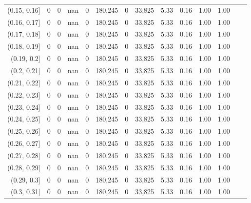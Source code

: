 \begin{tabular}{rrrrrrrrrrrrrr}
(0.15, 0.16]   &       0 &      0 &     nan &        0 &  180,245 &       0 &  33,825 &  5.33 &  0.16 &  1.00 &      1.00 \\
(0.16, 0.17]   &       0 &      0 &     nan &        0 &  180,245 &       0 &  33,825 &  5.33 &  0.16 &  1.00 &      1.00 \\
(0.17, 0.18]   &       0 &      0 &     nan &        0 &  180,245 &       0 &  33,825 &  5.33 &  0.16 &  1.00 &      1.00 \\
(0.18, 0.19]   &       0 &      0 &     nan &        0 &  180,245 &       0 &  33,825 &  5.33 &  0.16 &  1.00 &      1.00 \\
(0.19, 0.2]    &       0 &      0 &     nan &        0 &  180,245 &       0 &  33,825 &  5.33 &  0.16 &  1.00 &      1.00 \\
(0.2, 0.21]    &       0 &      0 &     nan &        0 &  180,245 &       0 &  33,825 &  5.33 &  0.16 &  1.00 &      1.00 \\
(0.21, 0.22]   &       0 &      0 &     nan &        0 &  180,245 &       0 &  33,825 &  5.33 &  0.16 &  1.00 &      1.00 \\
(0.22, 0.23]   &       0 &      0 &     nan &        0 &  180,245 &       0 &  33,825 &  5.33 &  0.16 &  1.00 &      1.00 \\
(0.23, 0.24]   &       0 &      0 &     nan &        0 &  180,245 &       0 &  33,825 &  5.33 &  0.16 &  1.00 &      1.00 \\
(0.24, 0.25]   &       0 &      0 &     nan &        0 &  180,245 &       0 &  33,825 &  5.33 &  0.16 &  1.00 &      1.00 \\
(0.25, 0.26]   &       0 &      0 &     nan &        0 &  180,245 &       0 &  33,825 &  5.33 &  0.16 &  1.00 &      1.00 \\
(0.26, 0.27]   &       0 &      0 &     nan &        0 &  180,245 &       0 &  33,825 &  5.33 &  0.16 &  1.00 &      1.00 \\
(0.27, 0.28]   &       0 &      0 &     nan &        0 &  180,245 &       0 &  33,825 &  5.33 &  0.16 &  1.00 &      1.00 \\
(0.28, 0.29]   &       0 &      0 &     nan &        0 &  180,245 &       0 &  33,825 &  5.33 &  0.16 &  1.00 &      1.00 \\
(0.29, 0.3]    &       0 &      0 &     nan &        0 &  180,245 &       0 &  33,825 &  5.33 &  0.16 &  1.00 &      1.00 \\
(0.3, 0.31]    &       0 &      0 &     nan &        0 &  180,245 &       0 &  33,825 &  5.33 &  0.16 &  1.00 &      1.00 \\

\end{tabular}

